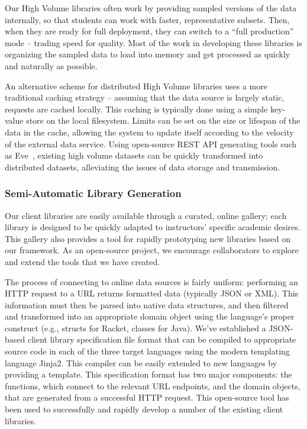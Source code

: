 Our High Volume libraries often work by providing sampled versions of the data internally, so that students can work with faster, representative subsets.
Then, when they are ready for full deployment, they can switch to a ``full production'' mode -- trading speed for quality. 
Most of the work in developing these libraries is organizing the sampled data to load into memory and get processed as quickly and naturally as possible.

An alternative scheme for distributed High Volume libraries uses a more traditional caching strategy -- assuming that the data source is largely static, requests are cached locally.
This caching is typically done using a simple key-value store on the local filesystem.
Limits can be set on the size or lifespan of the data in the cache, allowing the system to update itself according to the velocity of the external data service.
Using open-source REST API generating tools such as Eve~\cite{Eve}, existing high volume datasets can be quickly transformed into distributed datasets, alleviating the issues of data storage and transmission.

\subsubsection{Semi-Automatic Library Generation}

Our client libraries are easily available through a curated, online gallery; each library is designed to be quickly adapted to instructors' specific academic desires. 
This gallery also provides a tool for rapidly prototyping new libraries based on our framework.
As an open-source project, we encourage collaborators to explore and extend the tools that we have created.

The process of connecting to online data sources is fairly uniform: performing an HTTP request to a URL returns formatted data (typically JSON or XML). 
This information must then be parsed into native data structures, and then filtered and transformed into an appropriate domain object using the language's proper construct (e.g., structs for Racket, classes for Java).
We've established a JSON-based client library specification file format that can be compiled to appropriate source code in each of the three target languages using the modern templating language Jinja2. 
This compiler can be easily extended to new languages by providing a template.
This specification format has two major components: the functions, which connect to the relevant URL endpoints, and the domain objects, that are generated from a successful HTTP request. 
This open-source tool has been used to successfully and rapidly develop a number of the existing client libraries.

